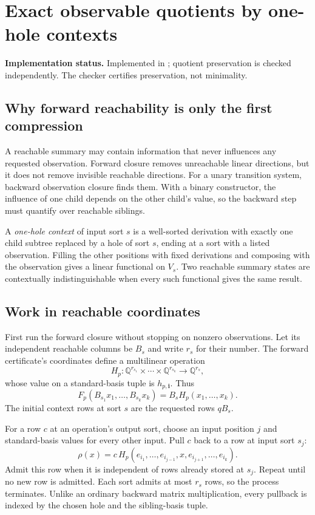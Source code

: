 \documentclass[11pt,letterpaper]{article}
\theoremstyle{definition}\newtheorem{definition}[theorem]{Definition}
\theoremstyle{remark}\newtheorem{remark}[theorem]{Remark}
\newcommand{\Q}{\mathbb Q}
\newcommand{\code}[1]{\texttt{\detokenize{#1}}}
\newcommand{\status}[1]{\par\noindent\textbf{Implementation status.} #1\par}
\begin{document}
\section{Exact observable quotients by one-hole contexts}
\label{sec:quotient}
\status{Implemented in \code{minimize}; quotient preservation is checked independently. The checker certifies preservation, not minimality.}

\subsection{Why forward reachability is only the first compression}
A reachable summary may contain information that never influences any requested observation. Forward closure removes unreachable linear directions, but it does not remove invisible reachable directions. For a unary transition system, backward observation closure finds them. With a binary constructor, the influence of one child depends on the other child's value, so the backward step must quantify over reachable siblings.

A \emph{one-hole context} of input sort $s$ is a well-sorted derivation with exactly one child subtree replaced by a hole of sort $s$, ending at a sort with a listed observation. Filling the other positions with fixed derivations and composing with the observation gives a linear functional on $V_s$. Two reachable summary states are contextually indistinguishable when every such functional gives the same result.

\subsection{Work in reachable coordinates}
First run the forward closure without stopping on nonzero observations. Let its independent reachable columns be $B_s$ and write $r_s$ for their number. The forward certificate's coordinates define a multilinear operation
\[
 H_p:\Q^{r_{s_1}}\times\cdots\times\Q^{r_{s_k}}\to\Q^{r_s},
\]
whose value on a standard-basis tuple is $h_{p,\bm i}$. Thus
\begin{equation}\label{eq:reachable-diagram}
 F_p(B_{s_1}x_1,\ldots,B_{s_k}x_k)=B_sH_p(x_1,\ldots,x_k).
\end{equation}
The initial context rows at sort $s$ are the requested rows $qB_s$.

For a row $c$ at an operation's output sort, choose an input position $j$ and standard-basis values for every other input. Pull $c$ back to a row at input sort $s_j$:
\begin{equation}\label{eq:context-pull}
 \rho(x)=c\,H_p(e_{i_1},\ldots,e_{i_{j-1}},x,e_{i_{j+1}},\ldots,e_{i_k}).
\end{equation}
Admit this row when it is independent of rows already stored at $s_j$. Repeat until no new row is admitted. Each sort admits at most $r_s$ rows, so the process terminates. Unlike an ordinary backward matrix multiplication, every pullback is indexed by the chosen hole and the sibling-basis tuple.
\end{document}
